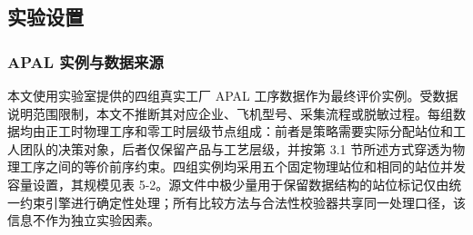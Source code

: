 \documentclass[journal,10pt]{IEEEtran}
\begin{document}
\subsection{实验设置}\label{ux5b9eux9a8cux8bbeux7f6e}

\subsubsection{APAL 实例与数据来源}\label{apal-ux5b9eux4f8bux4e0eux6570ux636eux6765ux6e90}

本文使用实验室提供的四组真实工厂 APAL 工序数据作为最终评价实例。受数据说明范围限制，本文不推断其对应企业、飞机型号、采集流程或脱敏过程。每组数据均由正工时物理工序和零工时层级节点组成：前者是策略需要实际分配站位和工人团队的决策对象，后者仅保留产品与工艺层级，并按第 3.1 节所述方式穿透为物理工序之间的等价前序约束。四组实例均采用五个固定物理站位和相同的站位并发容量设置，其规模见表 5-2。源文件中极少量用于保留数据结构的站位标记仅由统一约束引擎进行确定性处理；所有比较方法与合法性校验器共享同一处理口径，该信息不作为独立实验因素。
\end{document}
